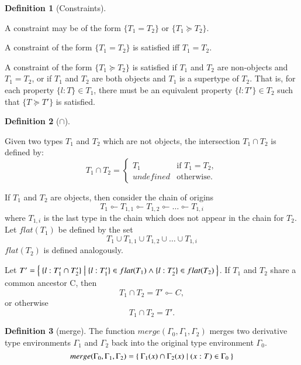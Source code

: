 \documentclass[a4paper]{article}
\theoremstyle{definition}
\newtheorem{definition}{Definition}[section]
\theoremstyle{dotless}
\newcommand*{\orig}{\ensuremath{\!\multimapinv\!}}
\begin{document}
\begin{definition}[Constraints]\label{constraintsDefn}

  A constraint may be of the form $\{T_1 = T_2\}$ or $\{T_1 \succeq T_2\}$.

  A constraint of the form $\{T_1 = T_2\}$ is satisfied iff $T_1 = T_2$.

  A constraint of the form $\{T_1 \succeq T_2\}$ is satisfied if $T_1$ and
  $T_2$ are non-objects and $T_1 = T_2$, or if $T_1$ and $T_2$ are both
  objects and $T_1$ is a supertype of $T_2$. That is, for each property
  $\{l:T\} \in T_1$, there must be an equivalent property $\{l: T'\} \in T_2$ such
  that $\{T \succeq T'\}$ is satisfied.

\end{definition}

\begin{definition}[$\cap$]\label{typeIntersect}

  Given two types $T_1$ and $T_2$ which are not objects, the intersection $T_1\cap T_2$ is defined by:
  \begin{equation}\label{intersect-eqn}
  	T_1\cap T_2 = 
  	\begin{cases}
  	  T_1 & \text{if $T_1 = T_2$}, \\
  	  undefined & \text{otherwise.}
  	\end{cases}
  \end{equation}

  If $T_1$ and $T_2$ are objects, then consider the chain of origins $$T_1\orig
  T_{1,1}\orig T_{1,2}\orig \dots\orig T_{1,i}$$ where $T_{1,i}$ is the last
  type in the chain which does not appear in the chain for $T_2$.
  Let $flat(T_1)$ be defined by the set
  $$T_1 \cup T_{1,1} \cup T_{1,2} \cup \ldots \cup T_{1,i}$$
  $flat(T_2)$ is defined analogously.

  Let $T' = \Set{ \{l:T_1'\cap T_2'\} | \{l:T_1'\}\in flat(T_1) \land \{l:T_2'\}\in flat(T_2)}$.
  If $T_1$ and $T_2$ share a common ancestor C, then $$T_1\cap T_2 = T'\orig C,$$ or otherwise $$T_1\cap T_2 = T'.$$
  

\end{definition}

\begin{definition}[merge]\label{merge}
  The function $merge(\Gamma_0, \Gamma_1, \Gamma_2)$ merges two derivative type environments $\Gamma_1$ and $\Gamma_2$ back into the original type environment $\Gamma_0$.
  \begin{equation} \label{merge-eqn}
	merge (\Gamma_0, \Gamma_1, \Gamma_2) = \Set{ \Gamma_1(x) \cap \Gamma_2(x) | (x: T) \in \Gamma_0 }
  \end{equation}
\end{definition}
\end{document}
